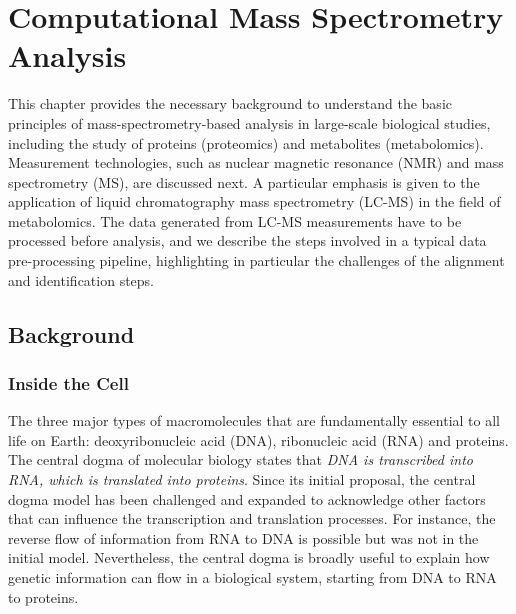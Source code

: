 \chapter{Computational Mass Spectrometry Analysis}
\label{c:background}


This chapter provides the necessary background to understand the basic principles of mass-spectrometry-based analysis in large-scale biological studies, including the study of proteins (proteomics) and metabolites (metabolomics). Measurement technologies, such as nuclear magnetic resonance (NMR) and mass spectrometry (MS), are discussed next. A particular emphasis is given to the application of liquid chromatography mass spectrometry (LC-MS) in the field of metabolomics. The data generated from LC-MS measurements have to be processed before analysis, and we describe the steps involved in a typical data pre-processing pipeline, highlighting in particular the challenges of the alignment and identification steps.

\section{Background}

\subsection{Inside the Cell}

The three major types of macromolecules that are fundamentally essential to all life on Earth: deoxyribonucleic acid (DNA), ribonucleic acid (RNA) and proteins. The central dogma of molecular biology states that \emph{DNA is transcribed into RNA, which is translated into proteins}. Since its initial proposal, the central dogma model has been challenged and expanded to acknowledge other factors that can influence the transcription and translation processes. For instance, the reverse flow of information from RNA to DNA is possible but was not in the initial model. Nevertheless, the central dogma is broadly useful to explain how genetic information can flow in a biological system, starting from DNA to RNA to proteins. 

